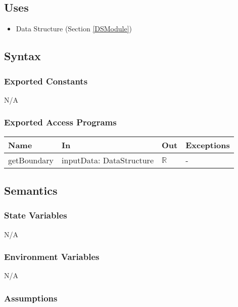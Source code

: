 \documentclass[12pt, titlepage]{article}
\begin{document}
\subsection{Uses}
\begin{itemize}
	\item Data Structure (Section \ref{DSModule})
\end{itemize}

\subsection{Syntax}

\subsubsection{Exported Constants}
N/A
\subsubsection{Exported Access Programs}

\begin{center}
	\begin{tabular}{p{2cm} p{3cm} p{4cm} p{2cm}}
		\hline
		\textbf{Name} & \textbf{In} & \textbf{Out} & \textbf{Exceptions} \\
		\hline
		getBoundary & inputData: DataStructure & $\mathbb{R}$ & - \\
		\hline
	\end{tabular}
\end{center}

\subsection{Semantics}

\subsubsection{State Variables}

N/A

\subsubsection{Environment Variables}

N/A

\subsubsection{Assumptions}
\end{document}
